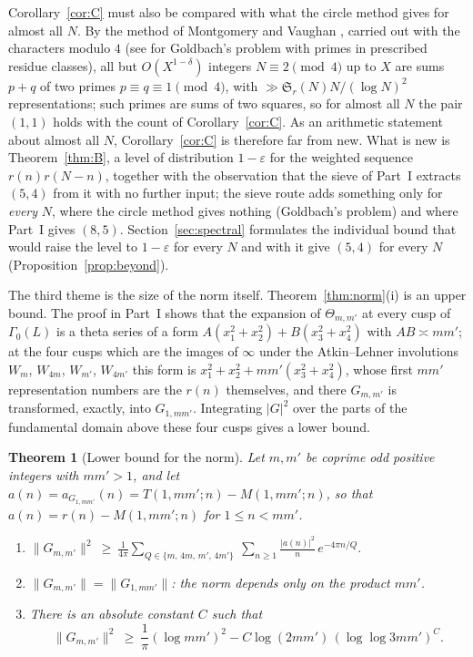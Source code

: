 ﻿\documentclass[11pt]{amsart}
\newtheorem{theorem}{Theorem}[section]
\theoremstyle{remark}
\newcommand{\Sg}{\mathfrak{S}}
\newcommand{\e}{\varepsilon}
\begin{document}
Corollary~\ref{cor:C} must also be compared with what the circle method gives for almost all $N$. By the method of Montgomery and Vaughan \cite{MV}, carried out with the characters modulo $4$ (see \cite{BauerWang} for Goldbach's problem with primes in prescribed residue classes), all but $O(X^{1-\delta})$ integers $N\equiv2\pmod4$ up to $X$ are sums $p+q$ of two primes $p\equiv q\equiv1\pmod 4$, with $\gg\Sg_r(N)N/(\log N)^2$ representations; such primes are sums of two squares, so for almost all $N$ the pair $(1,1)$ holds with the count of Corollary~\ref{cor:C}. As an arithmetic statement about almost all $N$, Corollary~\ref{cor:C} is therefore far from new. What is new is Theorem~\ref{thm:B}, a level of distribution $1-\e$ for the weighted sequence $r(n)r(N-n)$, together with the observation that the sieve of Part~I extracts $(5,4)$ from it with no further input; the sieve route adds something only for \emph{every} $N$, where the circle method gives nothing (Goldbach's problem) and where Part~I gives $(8,5)$. Section~\ref{sec:spectral} formulates the individual bound that would raise the level to $1-\e$ for every $N$ and with it give $(5,4)$ for every $N$ (Proposition~\ref{prop:beyond}).

The third theme is the size of the norm itself. Theorem~\ref{thm:norm}(i) is an upper bound. The proof in Part~I shows that the expansion of $\Theta_{m,m'}$ at every cusp of $\Gamma_0(L)$ is a theta series of a form $A(x_1^2+x_2^2)+B(x_3^2+x_4^2)$ with $AB\asymp mm'$; at the four cusps which are the images of $\infty$ under the Atkin--Lehner involutions $W_m$, $W_{4m}$, $W_{m'}$, $W_{4m'}$ this form is $x_1^2+x_2^2+mm'(x_3^2+x_4^2)$, whose first $mm'$ representation numbers are the $r(n)$ themselves, and there $G_{m,m'}$ is transformed, exactly, into $G_{1,mm'}$. Integrating $|G|^2$ over the parts of the fundamental domain above these four cusps gives a lower bound.

\begin{theorem}[Lower bound for the norm]\label{thm:lower}
Let $m,m'$ be coprime odd positive integers with $mm'>1$, and let $a(n)=a_{G_{1,mm'}}(n)=T(1,mm';n)-M(1,mm';n)$, so that $a(n)=r(n)-M(1,mm';n)$ for $1\le n<mm'$.
\begin{enumerate}[label=\textup{(\roman*)},leftmargin=2.2em]
\item $\displaystyle \|G_{m,m'}\|^2\ \ge\ \frac1{4\pi}\sum_{Q\in\{m,\,4m,\,m',\,4m'\}}\ \sum_{n\ge1}\frac{|a(n)|^2}{n}\,e^{-4\pi n/Q}.$
\item $\|G_{m,m'}\|=\|G_{1,mm'}\|$: the norm depends only on the product $mm'$.
\item There is an absolute constant $C$ such that
\[
\|G_{m,m'}\|^2\ \ge\ \frac1\pi(\log mm')^2-C\log(2mm')\,(\log\log 3mm')^{C}.
\]
\end{enumerate}
\end{theorem}
\end{document}
